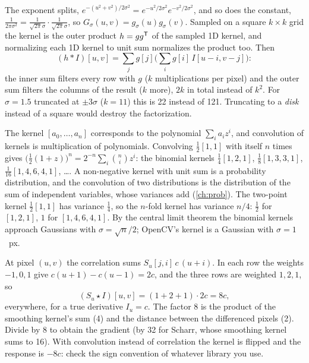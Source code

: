 \begin{solutions}
  \item The exponent splits, $e^{-(u^2 + v^2)/2\sigma^2} = e^{-u^2/2\sigma^2}e^{-v^2/2\sigma^2}$, and so does the constant, $\frac1{2\pi\sigma^2} = \frac1{\sqrt{2\pi}\sigma}\cdot\frac1{\sqrt{2\pi}\sigma}$, so
        $G_\sigma(u, v) = g_\sigma(u)g_\sigma(v)$. Sampled on a square $k\times k$ grid the kernel is the outer product $h = gg^{\mathsf{T}}$ of the sampled 1D kernel, and normalizing
        each 1D kernel to unit sum normalizes the product too. Then
        \[
          (h * I)[u, v] = \sum_jg[j]\Big(\sum_ig[i]\,I[u - i, v - j]\Big):
        \]
        the inner sum filters every row with $g$ ($k$ multiplications per pixel) and the outer sum filters the columns of the result ($k$ more), $2k$ in total
        instead of $k^2$. For $\sigma = 1.5$ truncated at $\pm3\sigma$ ($k = 11$) this is 22 instead of 121. Truncating to a \emph{disk} instead of a square would destroy
        the factorization.

  \item The kernel $[a_0, \dots, a_n]$ corresponds to the polynomial $\sum_ia_iz^i$, and convolution of kernels is multiplication of polynomials. Convolving
        $\tfrac12[1, 1]$ with itself $n$ times gives $\big(\tfrac12(1 + z)\big)^n = 2^{-n}\sum_i\binom{n}{i}z^i$: the binomial kernels $\tfrac14[1, 2, 1]$, $\tfrac18[1, 3, 3, 1]$, $\tfrac1{16}[1, 4, 6, 4, 1]$, \dots.
        A non-negative kernel with unit sum is a probability distribution, and the convolution of two distributions is the distribution of the sum of
        independent variables, whose variances add (\cref{ch:prob}). The two-point kernel $\tfrac12[1, 1]$ has variance $\tfrac14$, so the $n$-fold kernel has variance $n/4$:
        $\tfrac12$ for $[1, 2, 1]$, $1$ for $[1, 4, 6, 4, 1]$. By the central limit theorem the binomial kernels approach Gaussians with $\sigma = \sqrt n/2$; OpenCV's
         kernel is a Gaussian with $\sigma = 1$~px.

  \item At pixel $(u, v)$ the correlation sums $S_u[j, i]\,c\,(u + i)$. In each row the weights $-1, 0, 1$ give $c(u + 1) - c(u - 1) = 2c$, and the three rows are
        weighted $1, 2, 1$, so
        \[
          (S_u\star I)[u, v] = (1 + 2 + 1)\cdot2c = 8c,
        \]
        everywhere, for a true derivative $I_u = c$. The factor 8 is the product of the smoothing kernel's sum (4) and the distance between the differenced
        pixels (2). Divide by 8 to obtain the gradient (by 32 for Scharr, whose smoothing kernel sums to 16). With convolution instead of correlation the
        kernel is flipped and the response is $-8c$: check the sign convention of whatever library you use.


\end{solutions}
